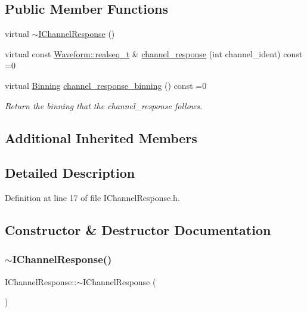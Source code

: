 \subsection*{Public Member Functions}
\begin{DoxyCompactItemize}
\item 
virtual \hyperlink{class_wire_cell_1_1_i_channel_response_aa97564060e81d7b77733e755b010bdd5}{$\sim$\+I\+Channel\+Response} ()
\item 
virtual const \hyperlink{namespace_wire_cell_1_1_waveform_a479175e541c8545e87cd8063b74b6956}{Waveform\+::realseq\+\_\+t} \& \hyperlink{class_wire_cell_1_1_i_channel_response_aee79a65bc671678d529eca0e4792e10d}{channel\+\_\+response} (int channel\+\_\+ident) const =0
\item 
virtual \hyperlink{class_wire_cell_1_1_binning}{Binning} \hyperlink{class_wire_cell_1_1_i_channel_response_a6a3daf077f98883b5d4f9dd6529e99fe}{channel\+\_\+response\+\_\+binning} () const =0
\begin{DoxyCompactList}\small\item\em Return the binning that the channel\+\_\+response follows. \end{DoxyCompactList}\end{DoxyCompactItemize}
\subsection*{Additional Inherited Members}


\subsection{Detailed Description}


Definition at line 17 of file I\+Channel\+Response.\+h.



\subsection{Constructor \& Destructor Documentation}
\mbox{\label{class_wire_cell_1_1_i_channel_response_aa97564060e81d7b77733e755b010bdd5}} 
\subsubsection{\texorpdfstring{$\sim$\+I\+Channel\+Response()}{~IChannelResponse()}}
{\footnotesize\ttfamily I\+Channel\+Response\+::$\sim$\+I\+Channel\+Response (\begin{DoxyParamCaption}{ }\end{DoxyParamCaption})\hspace{0.3cm}{\ttfamily [virtual]}}



